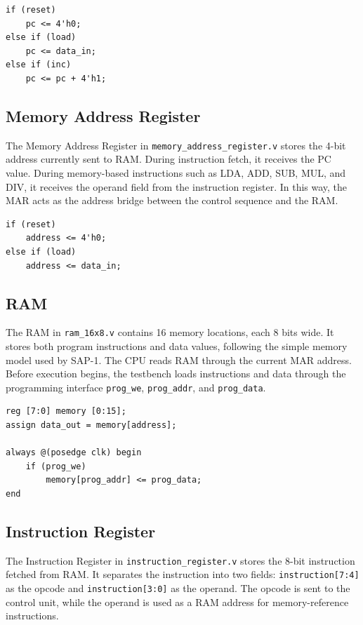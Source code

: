 \documentclass[12pt,a4paper]{article}
\begin{document}
\begin{lstlisting}[style=verilogstyle,caption={Program Counter update logic}]
if (reset)
    pc <= 4'h0;
else if (load)
    pc <= data_in;
else if (inc)
    pc <= pc + 4'h1;
\end{lstlisting}

\subsection{Memory Address Register}

The Memory Address Register in \texttt{memory\_address\_register.v} stores the 4-bit address currently sent to RAM. During instruction fetch, it receives the PC value. During memory-based instructions such as LDA, ADD, SUB, MUL, and DIV, it receives the operand field from the instruction register. In this way, the MAR acts as the address bridge between the control sequence and the RAM.

\begin{lstlisting}[style=verilogstyle,caption={MAR load logic}]
if (reset)
    address <= 4'h0;
else if (load)
    address <= data_in;
\end{lstlisting}

\subsection{RAM}

The RAM in \texttt{ram\_16x8.v} contains 16 memory locations, each 8 bits wide. It stores both program instructions and data values, following the simple memory model used by SAP-1. The CPU reads RAM through the current MAR address. Before execution begins, the testbench loads instructions and data through the programming interface \texttt{prog\_we}, \texttt{prog\_addr}, and \texttt{prog\_data}.

\begin{lstlisting}[style=verilogstyle,caption={RAM storage and program loading}]
reg [7:0] memory [0:15];
assign data_out = memory[address];

always @(posedge clk) begin
    if (prog_we)
        memory[prog_addr] <= prog_data;
end
\end{lstlisting}

\subsection{Instruction Register}

The Instruction Register in \texttt{instruction\_register.v} stores the 8-bit instruction fetched from RAM. It separates the instruction into two fields: \texttt{instruction[7:4]} as the opcode and \texttt{instruction[3:0]} as the operand. The opcode is sent to the control unit, while the operand is used as a RAM address for memory-reference instructions.
\end{document}
